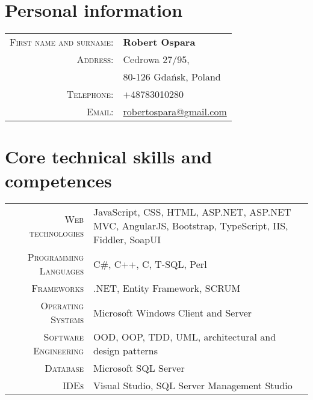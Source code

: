 \documentclass[a4paper,12pt]{article}
\begin{document}
\mbox{}
\par{\bigskip\par}

\section{Personal information}

\begin{tabular}{rl}
	\textsc{First name and surname:}&  \textbf{Robert Ospara} \\
	\textsc{Address:}& Cedrowa 27/95, \\
	\textsc{}& 80-126 Gdańsk, Poland \\
	\textsc{Telephone:}& +48783010280 \\
	\textsc{Email:}& \href{mailto:robertospara@gmail.com}{robertospara@gmail.com}
\end{tabular}

\vspace{2em}

\section{Core technical skills and competences}
\begin{tabular}{r|p{9.5cm}}
	\textsc{Web technologies}
	&\footnotesize{JavaScript, CSS, HTML, ASP.NET, ASP.NET MVC, AngularJS, Bootstrap, TypeScript, IIS, Fiddler, SoapUI} \\
	\textsc{Programming Languages}
	&\footnotesize{C\#, C++, C, T-SQL, Perl} \\
	\textsc{Frameworks}
	&\footnotesize{.NET, Entity Framework, SCRUM} \\
	\textsc{Operating Systems}
	&\footnotesize{Microsoft Windows Client and Server} \\
	\textsc{Software Engineering}
	&\footnotesize{OOD, OOP, TDD, UML, architectural and design patterns} \\
	\textsc{Database}
	&\footnotesize{Microsoft SQL Server} \\
	\textsc{IDEs}
	&\footnotesize{Visual Studio, SQL Server Management Studio} \\
\end{tabular}
\end{document}
